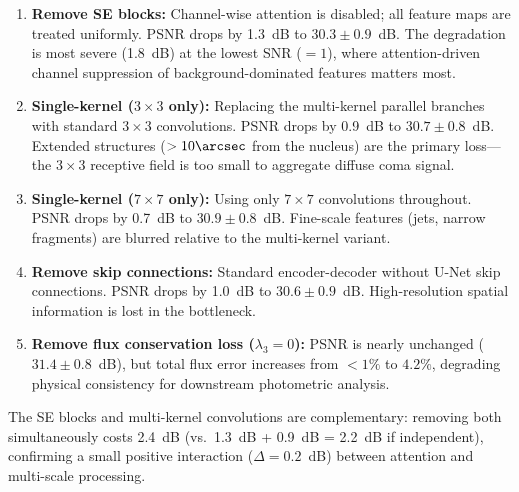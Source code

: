 \documentclass[preprint2]{aastex631}
\begin{document}
\begin{enumerate}
    \item \textbf{Remove SE blocks:} Channel-wise attention is disabled; all feature maps are treated uniformly. PSNR drops by 1.3~dB to $30.3 \pm 0.9$~dB. The degradation is most severe (1.8~dB) at the lowest SNR ($=1$), where attention-driven channel suppression of background-dominated features matters most.
    \item \textbf{Single-kernel ($3\times3$ only):} Replacing the multi-kernel parallel branches with standard $3\times3$ convolutions. PSNR drops by 0.9~dB to $30.7 \pm 0.8$~dB. Extended structures ($>10\arcsec$ from the nucleus) are the primary loss---the $3\times3$ receptive field is too small to aggregate diffuse coma signal.
    \item \textbf{Single-kernel ($7\times7$ only):} Using only $7\times7$ convolutions throughout. PSNR drops by 0.7~dB to $30.9 \pm 0.8$~dB. Fine-scale features (jets, narrow fragments) are blurred relative to the multi-kernel variant.
    \item \textbf{Remove skip connections:} Standard encoder-decoder without U-Net skip connections. PSNR drops by 1.0~dB to $30.6 \pm 0.9$~dB. High-resolution spatial information is lost in the bottleneck.
    \item \textbf{Remove flux conservation loss ($\lambda_3 = 0$):} PSNR is nearly unchanged ($31.4 \pm 0.8$~dB), but total flux error increases from $<1\%$ to $4.2\%$, degrading physical consistency for downstream photometric analysis.
\end{enumerate}

The SE blocks and multi-kernel convolutions are complementary: removing both simultaneously costs 2.4~dB (vs.\ 1.3~dB + 0.9~dB = 2.2~dB if independent), confirming a small positive interaction ($\Delta = 0.2$~dB) between attention and multi-scale processing.
\end{document}
